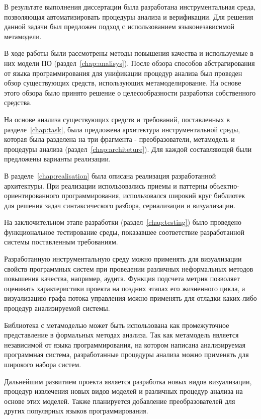 \conclusion

В результате выполнения диссертации была разработана инструментальная среда,
позволяющая автоматизировать процедуры анализа и верификации. Для решения данной
задачи был предложен подход с использованием языконезависимой метамодели.

В ходе работы были рассмотрены методы повышения качества и используемые в них
модели ПО (раздел~\ref{chap:analisys}). После обзора способов абстрагирования от
языка программирования для унификации процедур анализа был проведен обзор
существующих средств, использующих метамоделирование. На основе этого обзора
было принято решение о целесообразности разработки собственного средства.

На основе анализа существующих средств и требований, поставленных в
разделе~\ref{chap:task}, была предложена архитектура инструментальной среды,
которая была разделена на три фрагмента - преобразователи, метамодель и
процедуры анализа (раздел~\ref{chap:architeture}). Для каждой составляющей были
предложены варианты реализации.

В разделе~\ref{chap:realisation} была описана реализация разработанной
архитектуры. При реализации использовались приемы и паттерны объектно-
ориентированного программирования, использовался широкий круг библиотек для
решения задач синтаксического разбора, сериализации и визуализации.

На заключительном этапе разработки (раздел~\ref{chap:testing}) было проведено
функциональное тестирование среды, показавшее соответствие разработанной системы
поставленным требованиям.

Разработанную инструментальную среду можно применять для визуализации свойств
программных систем при проведении различных неформальных методов повышения
качества, например, аудита. Функция подсчета метрик позволяет оценивать
характеристики проекта на поздних этапах его жизненного цикла, а визуализацию
графа потока управления можно применять для отладки каких-либо процедур
анализируемой системы.

Библиотека с метамоделью может быть использована как промежуточное представление
в формальных методах анализа. Так как метамодель является независимой от языка
программирования, на котором написана анализируемая программная система,
разработанные процедуры анализа можно применять для широкого набора систем.

Дальнейшим развитием проекта является разработка новых видов визуализации,
процедур извлечения новых видов моделей и различных процедур анализа на
основе этих моделей. Также планируется добавление преобразователей для других
популярных языков программирования.
